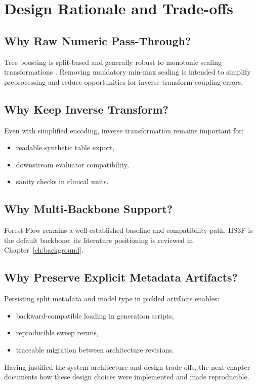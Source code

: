 \section{Design Rationale and Trade-offs}

\subsection{Why Raw Numeric Pass-Through?}

Tree boosting is split-based and generally robust to monotonic scaling transformations \cite{chen2016xgboost}.
Removing mandatory min-max scaling is intended to simplify preprocessing and reduce opportunities for inverse-transform coupling errors.

\subsection{Why Keep Inverse Transform?}

Even with simplified encoding, inverse transformation remains important for:
\begin{itemize}\tightlist
    \item readable synthetic table export,
    \item downstream evaluator compatibility,
    \item sanity checks in clinical units.
\end{itemize}

\subsection{Why Multi-Backbone Support?}

Forest-Flow \cite{jolicoeur2023forest} remains a well-established baseline and compatibility path.
HS3F \cite{akazan2024hs3f} is the default backbone; its literature positioning is reviewed in Chapter~\ref{ch:background}.

\subsection{Why Preserve Explicit Metadata Artifacts?}

Persisting split metadata and model type in pickled artifacts enables:
\begin{itemize}\tightlist
    \item backward-compatible loading in generation scripts,
    \item reproducible sweep reruns,
    \item traceable migration between architecture revisions.
\end{itemize}

Having justified the system architecture and design trade-offs, the next chapter documents how these design choices were implemented and made reproducible.
